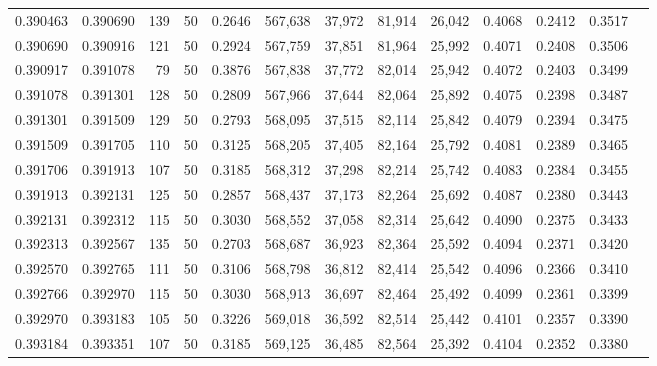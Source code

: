 \begin{tabular}{rrrrrrrrrrrrr}
0.390463 & 0.390690 &   139 &  50 &                                     0.2646 & 567,638 &  37,972 &  81,914 &  26,042 & 0.4068 & 0.2412 & 0.3517 \\
0.390690 & 0.390916 &   121 &  50 &                                     0.2924 & 567,759 &  37,851 &  81,964 &  25,992 & 0.4071 & 0.2408 & 0.3506 \\
0.390917 & 0.391078 &    79 &  50 &                                     0.3876 & 567,838 &  37,772 &  82,014 &  25,942 & 0.4072 & 0.2403 & 0.3499 \\
0.391078 & 0.391301 &   128 &  50 &                                     0.2809 & 567,966 &  37,644 &  82,064 &  25,892 & 0.4075 & 0.2398 & 0.3487 \\
0.391301 & 0.391509 &   129 &  50 &                                     0.2793 & 568,095 &  37,515 &  82,114 &  25,842 & 0.4079 & 0.2394 & 0.3475 \\
0.391509 & 0.391705 &   110 &  50 &                                     0.3125 & 568,205 &  37,405 &  82,164 &  25,792 & 0.4081 & 0.2389 & 0.3465 \\
0.391706 & 0.391913 &   107 &  50 &                                     0.3185 & 568,312 &  37,298 &  82,214 &  25,742 & 0.4083 & 0.2384 & 0.3455 \\
0.391913 & 0.392131 &   125 &  50 &                                     0.2857 & 568,437 &  37,173 &  82,264 &  25,692 & 0.4087 & 0.2380 & 0.3443 \\
0.392131 & 0.392312 &   115 &  50 &                                     0.3030 & 568,552 &  37,058 &  82,314 &  25,642 & 0.4090 & 0.2375 & 0.3433 \\
0.392313 & 0.392567 &   135 &  50 &                                     0.2703 & 568,687 &  36,923 &  82,364 &  25,592 & 0.4094 & 0.2371 & 0.3420 \\
0.392570 & 0.392765 &   111 &  50 &                                     0.3106 & 568,798 &  36,812 &  82,414 &  25,542 & 0.4096 & 0.2366 & 0.3410 \\
0.392766 & 0.392970 &   115 &  50 &                                     0.3030 & 568,913 &  36,697 &  82,464 &  25,492 & 0.4099 & 0.2361 & 0.3399 \\
0.392970 & 0.393183 &   105 &  50 &                                     0.3226 & 569,018 &  36,592 &  82,514 &  25,442 & 0.4101 & 0.2357 & 0.3390 \\
0.393184 & 0.393351 &   107 &  50 &                                     0.3185 & 569,125 &  36,485 &  82,564 &  25,392 & 0.4104 & 0.2352 & 0.3380 \\

\end{tabular}
